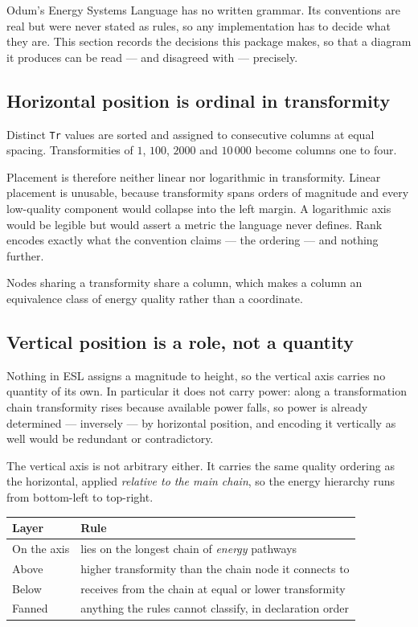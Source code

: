 \documentclass{article}
\begin{document}
Odum's Energy Systems Language has no written grammar. Its conventions are real
but were never stated as rules, so any implementation has to decide what they
are. This section records the decisions this package makes, so that a diagram it
produces can be read --- and disagreed with --- precisely.

\subsection{Horizontal position is ordinal in transformity}

Distinct \texttt{Tr} values are sorted and assigned to consecutive columns at
equal spacing. Transformities of $1$, $100$, $2000$ and $10\,000$ become columns
one to four.

Placement is therefore neither linear nor logarithmic in transformity. Linear
placement is unusable, because transformity spans orders of magnitude and every
low-quality component would collapse into the left margin. A logarithmic axis
would be legible but would assert a metric the language never defines. Rank
encodes exactly what the convention claims --- the ordering --- and nothing
further.

Nodes sharing a transformity share a column, which makes a column an equivalence
class of energy quality rather than a coordinate.

\subsection{Vertical position is a role, not a quantity}

Nothing in ESL assigns a magnitude to height, so the vertical axis carries no
quantity of its own. In particular it does not carry power: along a
transformation chain transformity rises because available power falls, so power
is already determined --- inversely --- by horizontal position, and encoding it
vertically as well would be redundant or contradictory.

The vertical axis is not arbitrary either. It carries the same quality ordering
as the horizontal, applied \emph{relative to the main chain}, so the energy
hierarchy runs from bottom-left to top-right.

\begin{table}[H]
\centering
\begin{tabular}{ll}
\toprule
Layer & Rule \\
\midrule
On the axis & lies on the longest chain of \emph{energy} pathways \\
Above       & higher transformity than the chain node it connects to \\
Below       & receives from the chain at equal or lower transformity \\
Fanned      & anything the rules cannot classify, in declaration order \\
\bottomrule
\end{tabular}
\end{table}
\end{document}
